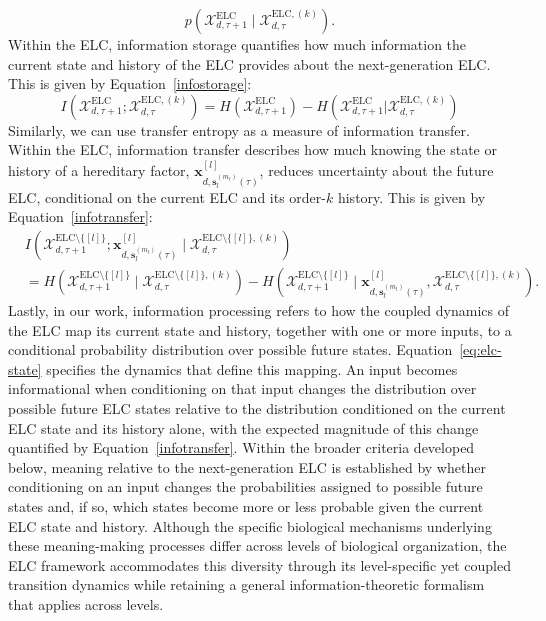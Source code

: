 \documentclass[pdflatex,sn-mathphys-num]{sn-jnl}
\theoremstyle{thmstylethree}
\theoremstyle{thmstyleone}
\newcommand{\ELC}{\mathrm{ELC}}
\begin{document}
\begin{equation}
p\left(
\mathcal{X}_{d,\tau+1}^{\text{ELC}}
\mid
\mathcal{X}_{d,\tau}^{\text{ELC},(k)}
\right).
\label{eq:elc-transition-distribution}
\end{equation}
Within the ELC, information storage quantifies how much information the current state and history of the ELC provides about the next-generation ELC. This is given by Equation~\ref{infostorage}:
\begin{equation}
\label{infostorage}
I(\mathcal{X}_{d,\tau + 1}^{\ELC}; \mathcal{X}_{d,\tau}^{\ELC,(k)}) = H(\mathcal{X}_{d,\tau + 1}^{\text{ELC}}) - H(\mathcal{X}_{d,\tau + 1}^{\text{ELC}} | \mathcal{X}_{d,\tau}^{\text{ELC},(k)})
\end{equation}
Similarly, we can use transfer entropy as a measure of information transfer. Within the ELC, information transfer describes how much knowing the state or history of a hereditary factor, $\mathbf{x}^{[l]}_{d,\mathbf{s}^{(m_l)}_l(\tau)}$, reduces uncertainty about the future ELC, conditional on the current ELC  and its order-$k$ history. This is given by Equation~\ref{infotransfer}:
\begin{align}
\label{infotransfer}
&I(\mathcal{X}_{d,\tau + 1}^{\ELC\setminus\{[l]\}}; 
\mathbf{x}^{[l]}_{d,\mathbf{s}^{(m_l)}_l(\tau)} 
\mid \mathcal{X}_{d,\tau}^{\ELC\setminus\{[l]\},(k)}) \\
\nonumber
&= H(\mathcal{X}_{d,\tau + 1}^{\ELC\setminus\{[l]\}} 
\mid \mathcal{X}_{d,\tau}^{\ELC\setminus\{[l]\},(k)})
- H(\mathcal{X}_{d,\tau + 1}^{\ELC\setminus\{[l]\}} 
\mid \mathbf{x}^{[l]}_{d,\mathbf{s}^{(m_l)}_l(\tau)}, 
\mathcal{X}_{d,\tau}^{\ELC\setminus\{[l]\},(k)}).
\end{align}
Lastly, in our work, information processing refers to how the coupled dynamics of the ELC map its current state and history, together with one or more inputs, to a conditional probability distribution over possible future states. Equation~\ref{eq:elc-state} specifies the dynamics that define this mapping. An input becomes informational when conditioning on that input changes the distribution over possible future ELC states relative to the distribution conditioned on the current ELC state and its history alone, with the expected magnitude of this change quantified by Equation~\ref{infotransfer}. Within the broader criteria developed below, meaning relative to the next-generation ELC is established by whether conditioning on an input changes the probabilities assigned to possible future states and, if so, which states become more or less probable given the current ELC state and history. Although the specific biological mechanisms underlying these meaning-making processes differ across levels of biological organization, the ELC framework accommodates this diversity through its level-specific yet coupled transition dynamics while retaining a general information-theoretic formalism that applies across levels.
\end{document}
